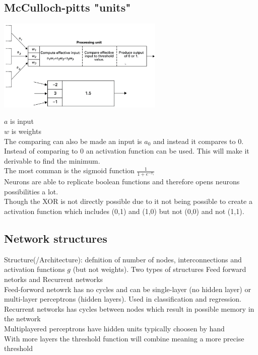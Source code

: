\documentclass[12pt, a4paper]{article}
\begin{document}
			\subsection{McCulloch-pitts "units"}
				\begin{center}
					\includegraphics[width=300px]{assets/neuron.png}
				\end{center}
				$a$ is input\\
				$w$ is weights\\
				The comparing can also be made an input is $a_0$ and instead it compares to 0.\\
				Instead of comparing to 0 an activation function can be used. This will make it derivable to find the minimum.\\
				The most comman is the sigmoid function $\frac{1}{1+e^{-x_i}}$\\
				Neurons are able to replicate boolean functions and therefore opens neurons possibilities a lot.\\
				Though the XOR is not directly possible due to it not being possible to create a activation function which includes (0,1) and (1,0) but not (0,0) and not (1,1).
			\subsection{Network structures}
				Structure(/Architecture): defnition of number of nodes, interconnections and activation functions $g$ (but not weights).
				Two types of structures Feed forward netorks and Recurrent networks\\
				Feed-forword netowrk has no cycles and can be single-layer (no hidden layer) or multi-layer perceptrons (hidden layers). Used in classification and regression.\\
				Recurrent networks has cycles between nodes which result in possible memory in the network\\
				Multiplayered perceptrons have hidden units typically choosen by hand\\
				With more layers the threshold function will combine meaning a more precise threshold
\end{document}
